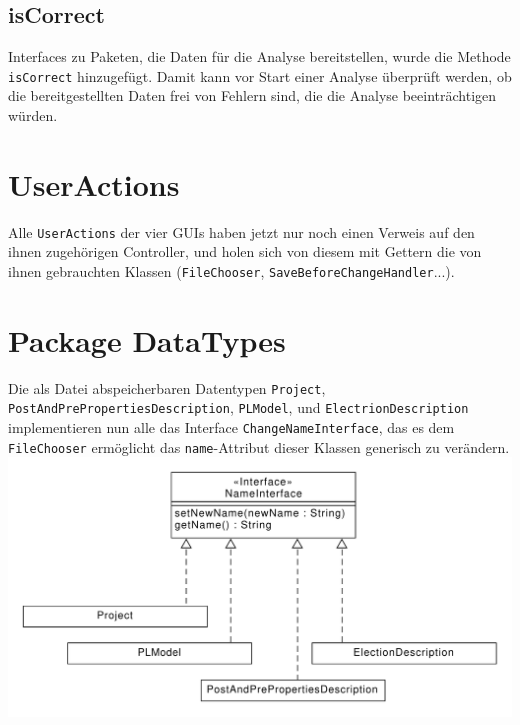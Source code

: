 \documentclass[a4paper]{scrreprt}
\begin{document}
\subsection{isCorrect}
Interfaces zu Paketen, die Daten für die Analyse bereitstellen, wurde die Methode \verb!isCorrect! hinzugefügt. Damit kann vor Start einer Analyse überprüft werden, ob die bereitgestellten Daten frei von Fehlern sind, die die Analyse beeinträchtigen würden.

\section{UserActions}
Alle \verb!UserActions! der vier GUIs haben jetzt nur noch einen Verweis auf den ihnen zugehörigen Controller, und holen sich von diesem mit Gettern die von ihnen gebrauchten Klassen (\verb!FileChooser!, \verb!SaveBeforeChangeHandler!...).

\section{Package DataTypes}
Die als Datei abspeicherbaren Datentypen \verb!Project!, \verb!PostAndPrePropertiesDescription!, \verb!PLModel!, und \verb!ElectrionDescription! implementieren nun alle das Interface \verb!ChangeNameInterface!, das es dem \verb!FileChooser! ermöglicht das \verb!name!-Attribut dieser Klassen generisch zu verändern.\\
\includegraphics[scale=0.5]{NameInterface.pdf}
\end{document}
